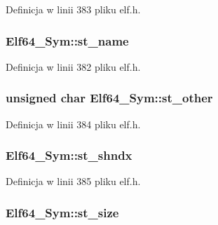 Definicja w linii 383 pliku elf.\-h.

\hypertarget{struct_elf64___sym_a4069f9db0c91ecc40bc2f4ddbdf28aff}{
\subsubsection[{st\-\_\-name}]{ Elf64\-\_\-\-Sym\-::st\-\_\-name}}\label{struct_elf64___sym_a4069f9db0c91ecc40bc2f4ddbdf28aff}


Definicja w linii 382 pliku elf.\-h.

\hypertarget{struct_elf64___sym_adba66dcdbe19ab3ecc24830a58549230}{
\subsubsection[{st\-\_\-other}]{\setlength{\rightskip}{0pt plus 5cm}unsigned char Elf64\-\_\-\-Sym\-::st\-\_\-other}}\label{struct_elf64___sym_adba66dcdbe19ab3ecc24830a58549230}


Definicja w linii 384 pliku elf.\-h.

\hypertarget{struct_elf64___sym_a942ca56d5692e290b23366388fc600e6}{
\subsubsection[{st\-\_\-shndx}]{ Elf64\-\_\-\-Sym\-::st\-\_\-shndx}}\label{struct_elf64___sym_a942ca56d5692e290b23366388fc600e6}


Definicja w linii 385 pliku elf.\-h.

\hypertarget{struct_elf64___sym_af5c72e0a09802b81e8087b303ec4d29f}{
\subsubsection[{st\-\_\-size}]{ Elf64\-\_\-\-Sym\-::st\-\_\-size}}\label{struct_elf64___sym_af5c72e0a09802b81e8087b303ec4d29f}


